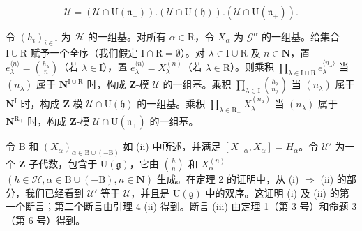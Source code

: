 \[
\mathcal {U} = (\mathcal {U} \cap \mathrm{U} (\mathfrak {n} _ {-})). (\mathcal {U} \cap \mathrm{U} (\mathfrak {h})). (\mathcal {U} \cap \mathrm{U} (\mathfrak {n} _ {+})).
\]

令 \((h_i)_{i\in \mathrm{I}}\) 为 \(\mathcal{H}\) 的一组基。对所有 \(\alpha \in \mathrm{R}\)，令 \(X_{\alpha}\) 为 \(\mathcal{G}^{\alpha}\) 的一组基。给集合 \(\mathrm{I}\cup \mathrm{R}\) 赋予一个全序（我们假定 \(\mathrm{I}\cap \mathrm{R} = \emptyset\)）。对 \(\lambda \in \mathrm{I}\cup \mathrm{R}\) 及 \(n\in \mathbf{N}\)，置 \(e_{\lambda}^{\langle n\rangle} = \binom{h_{\lambda}}{n}\)（若 \(\lambda \in \mathrm{I}\)），置 \(e_{\lambda}^{\langle n\rangle} = X_{\lambda}^{(n)}\)（若 \(\lambda \in \mathrm{R}\)）。则乘积 \(\prod_{\lambda \in \mathrm{I}\cup \mathrm{R}}e_{\lambda}^{\langle n_{\lambda}\rangle}\) 当 \((n_{\lambda})\) 属于 \(\mathbf{N}^{\mathrm{I}\cup \mathrm{R}}\) 时，构成 \(\mathbf{Z}\)-模 \(\mathcal{U}\) 的一组基。乘积 \(\prod_{\lambda \in \mathrm{I}}\binom{h_{\lambda}}{n_{\lambda}}\) 当 \((n_{\lambda})\) 属于 \(\mathbf{N}^{\mathrm{I}}\) 时，构成 \(\mathbf{Z}\)-模 \(\mathcal{U}\cap \mathrm{U}(\mathfrak{h})\) 的一组基。乘积 \(\prod_{\lambda \in \mathrm{R}_{+}}X_{\lambda}^{(n_{\lambda})}\) 当 \((n_{\lambda})\) 属于 \(\mathbf{N}^{\mathrm{R}_{+}}\) 时，构成 \(\mathbf{Z}\)-模 \(\mathcal{U}\cap \mathrm{U}(\mathfrak{n}_{+})\) 的一组基。

令 B 和 \((X_{\alpha})_{\alpha\in\mathrm{B}\cup(-\mathrm{B})}\) 如 (ii) 中所述，并满足 \([X_{-\alpha},X_{\alpha}]=H_{\alpha}\)。令 \(\mathcal{U}'\) 为一个 \(\mathbf{Z}\)-子代数，包含于 \(\mathrm{U}(\mathfrak{g})\)，它由 \(\binom{h}{n}\) 和 \(X_{\alpha}^{(n)}\) \((h\in\mathcal{H},\alpha\in\mathrm{B}\cup(-\mathrm{B}),n\in\mathbf{N})\) 生成。在定理 2 的证明中，从 (i) \(\Longrightarrow\) (ii) 的部分，我们已经看到 \(\mathcal{U}'\) 等于 \(\mathcal{U}\)，并且是 \(\mathrm{U}(\mathfrak{g})\) 中的双序。这证明 (i) 及 (ii) 的第一个断言；第二个断言由引理 4 (ii) 得到。断言 (iii) 由定理 1（第 3 号）和命题 3（第 6 号）得到。

